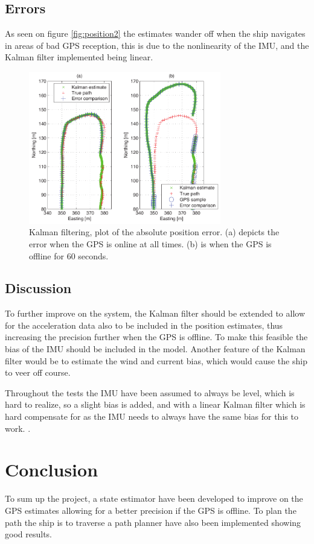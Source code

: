 \documentclass[journal]{IEEEtran}
\begin{document}
\subsection{Errors}
As seen on figure \ref{fig:position2} the estimates wander off when the ship navigates in areas of bad GPS reception, this is due to the nonlinearity of the IMU, and the Kalman filter implemented being linear. 
\begin{figure}
	\begin{center}
		\includegraphics[width=8.4cm]{img/states2}    %
		\caption{Kalman filtering, plot of the absolute position error. (a) depicts the error when the GPS is online at all times. (b) is when the GPS is offline for 60 seconds.}  %
		\label{fig:states2}               
	\end{center}                                 %
\end{figure}


\subsection{Discussion}
To further improve on the system, the Kalman filter should be extended to allow for the acceleration data also to be included in the position estimates, thus increasing the precision further when the GPS is offline. To make this feasible the bias of the IMU should be included in the model. Another feature of the Kalman filter would be to estimate the wind and current bias, which would cause the ship to veer off course. 

Throughout the tests the IMU have been assumed to always be level, which is hard to realize, so a slight bias is added, and with a linear Kalman filter which is hard compensate for as the IMU needs to always have the same bias for this to work. .

\section{Conclusion}
To sum up the project, a state estimator have been developed to improve on the GPS estimates allowing for a better precision if the GPS is offline. To plan the path the ship is to traverse a path planner have also been implemented showing good results. 
\end{document}
